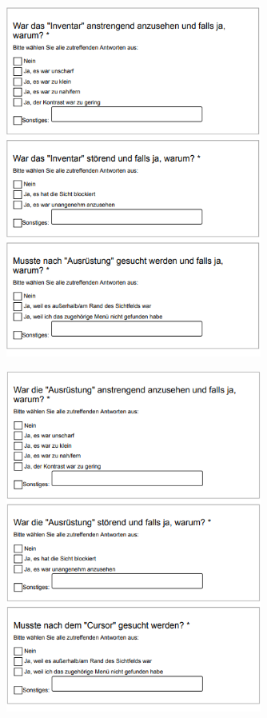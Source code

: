 	\begin{figure}[htbp]
		\centering
		\includegraphics[width=0.75\textwidth]{Fragen/3Szenario.png}
	\end{figure}

	\begin{figure}[htbp]
		\centering
		\includegraphics[width=0.75\textwidth]{Fragen/4Szenario.png}
	\end{figure}

